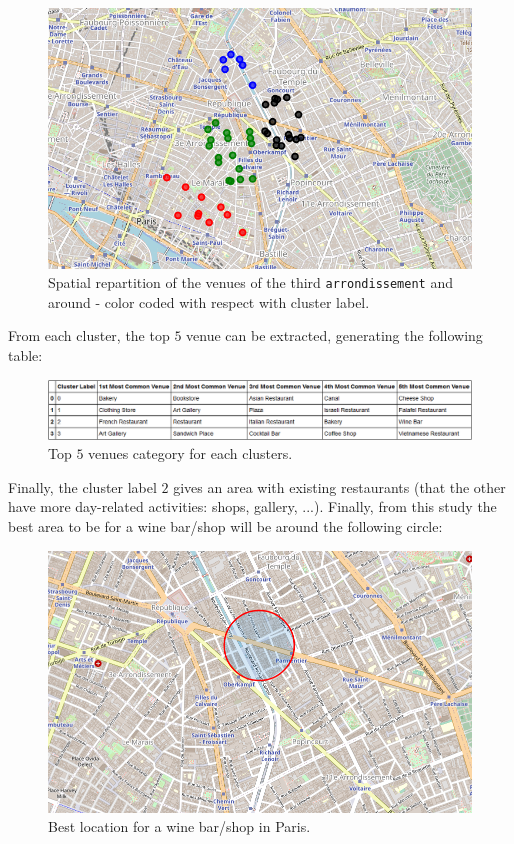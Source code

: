 \documentclass[english]{article}
\begin{document}
	\begin{figure}[h!]
		\centering
		\includegraphics[width=0.60\linewidth,keepaspectratio]{Figures/FoliumClustered}
		\caption{Spatial repartition of the venues of the third \texttt{arrondissement} and around - color coded with respect with cluster label.}
		\label{FoliumMapColored}
	\end{figure}
	From each cluster, the top $5$ venue can be extracted, generating the following table:	
	\begin{figure}[h!]
		\centering
		\includegraphics[width=\linewidth,keepaspectratio]{Figures/TopFive}
		\caption{Top $5$ venues category for each clusters.}
		\label{ClustersVenueCat}
	\end{figure}
	Finally, the cluster label $2$ gives an area with existing restaurants (that the other have more day-related activities: shops, gallery, ...). Finally, from this study the best area to be for a wine bar/shop will be around the following circle:
	\begin{figure}[h]
		\centering
		\includegraphics[width=0.60\linewidth,keepaspectratio]{Figures/FoliumFinal}
		\caption{Best location for a wine bar/shop in Paris.}
		\label{FinalLocation}
	\end{figure}
\end{document}
